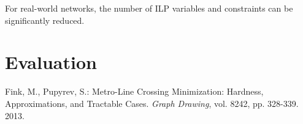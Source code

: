\documentclass{llncs}
\begin{document}
For real-world networks, the number of ILP variables and constraints can be significantly reduced.

\section{Evaluation}



%
%
\begin{thebibliography}{5}
%
Fink, M., Pupyrev, S.:
Metro-Line Crossing Minimization: Hardness, Approximations, and Tractable Cases.
\textit{Graph Drawing}, vol. 8242, pp. 328-339. 2013.

\end{thebibliography}
\end{document}
